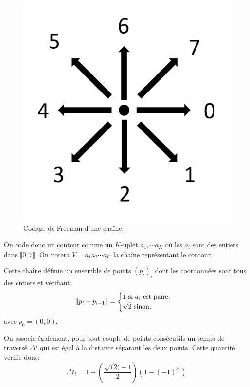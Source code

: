 \begin{figure}[h!]
    \centering
    \includegraphics[scale=0.45]{assets/freeman-chain-encoding}
    \caption{Codage de Freeman d'une chaîne.}
	\label{fig:freeman-chain-encoding}
\end{figure}

On code donc un contour comme un $K$-uplet $a_1, \cdots a_K$ 
où les $a_i$ sont des entiers dans $\llbracket 0, 7 \rrbracket$. 
On notera $V = a_1 a_2 \cdots a_K$ la chaîne représentant le 
contour.

Cette chaîne définie un ensemble de points $(p_i)_i$ 
dont les coordonnées sont tous des entiers et vérifiant:
\[
\left\Vert p_i - p_{i-1}\right\Vert =
\begin{cases}
  1 \text{ si } a_i \text{ est paire;} \\
  \sqrt{2} \text{ sinon;} \\
\end{cases}
\]
avec $p_0 = (0,0)$.

On associe également, pour tout couple de points consécutifs 
un temps de traversé $\Delta t$ qui est égal à la distance 
séparant les deux points.
Cette quantité vérifie donc:
\[
\Delta t_i = 1 + \left( \frac{\sqrt(2) - 1}{2} \right) \left( 1 - (-1)^{a_i} \right)
\]

